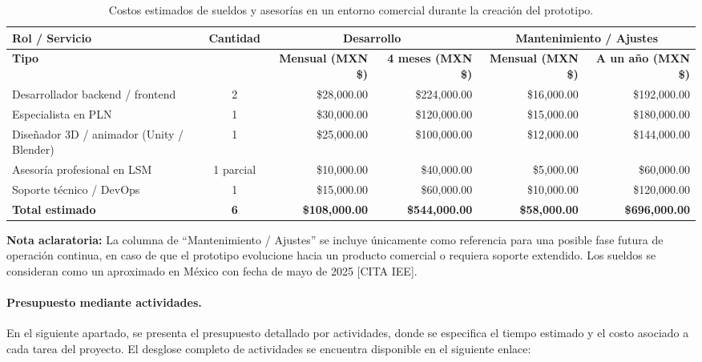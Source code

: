 \begin{table}[H]
	\centering
	\renewcommand{\arraystretch}{1.6}
	\setlength{\tabcolsep}{10pt}
	\Huge
	\begin{adjustbox}{max width=\textwidth}
		\begin{tabular}{|p{5.8cm}|c|r|r|r|r|}
			\hline
			\textbf{Rol / Servicio} & \textbf{Cantidad} & \multicolumn{2}{c|}{\textbf{Desarrollo}} & \multicolumn{2}{c|}{\textbf{Mantenimiento / Ajustes}} \\ \hline
			\textbf{Tipo} & & \textbf{Mensual (MXN \$)} & \textbf{4 meses (MXN \$)} & \textbf{Mensual (MXN \$)} & \textbf{A un año (MXN \$)} \\ \hline
			Desarrollador backend / frontend & 2 & \$28,000.00 & \$224,000.00 & \$16,000.00 & \$192,000.00 \\ \hline
			Especialista en PLN & 1 & \$30,000.00 & \$120,000.00 & \$15,000.00 & \$180,000.00 \\ \hline
			Diseñador 3D / animador (Unity / Blender) & 1 & \$25,000.00 & \$100,000.00 & \$12,000.00 & \$144,000.00 \\ \hline
			Asesoría profesional en LSM & 1 parcial & \$10,000.00 & \$40,000.00 & \$5,000.00 & \$60,000.00 \\ \hline
			Soporte técnico / DevOps & 1 & \$15,000.00 & \$60,000.00 & \$10,000.00 & \$120,000.00 \\ \hline
			\textbf{Total estimado} & \textbf{6} & \textbf{\$108,000.00} & \textbf{\$544,000.00} & \textbf{\$58,000.00} & \textbf{\$696,000.00} \\ \hline
		\end{tabular}
	\end{adjustbox}
	\caption{Costos estimados de sueldos y asesorías en un entorno comercial durante la creación del prototipo.}
	\label{tab:sueldos_comercial}
\end{table}



\noindent \textbf{Nota aclaratoria:}  
La columna de “Mantenimiento / Ajustes” se incluye únicamente como referencia para una posible fase futura de operación continua, en caso de que el prototipo evolucione hacia un producto comercial o requiera soporte extendido. Los sueldos se consideran como un aproximado en México con fecha de mayo de 2025 [CITA IEE].  


\paragraph{\textbf{Presupuesto mediante actividades.}} 
En el siguiente apartado, se presenta el presupuesto detallado por actividades, donde se especifica el tiempo estimado y el costo asociado a cada tarea del proyecto.
El desglose completo de actividades se encuentra disponible en el siguiente enlace:

